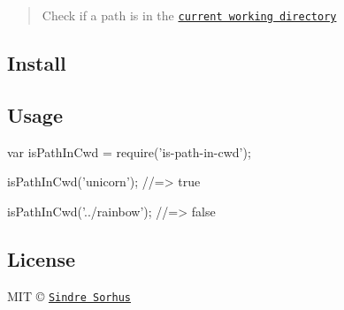 \begin{quote}
Check if a path is in the \href{http://en.wikipedia.org/wiki/Working_directory}{\tt current working directory} \end{quote}


\subsection*{Install}




\subsection*{Usage}


\begin{DoxyCode}
var isPathInCwd = require('is-path-in-cwd');

isPathInCwd('unicorn');
//=> true

isPathInCwd('../rainbow');
//=> false
\end{DoxyCode}


\subsection*{License}

M\+IT © \href{http://sindresorhus.com}{\tt Sindre Sorhus} 